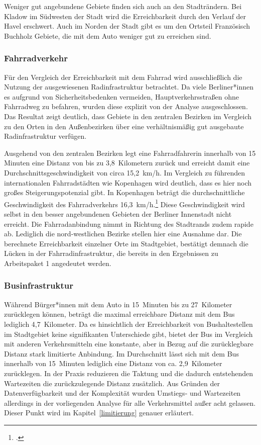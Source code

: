 Weniger gut angebundene Gebiete finden sich auch an den Stadträndern. Bei Kladow im Südwesten der Stadt wird die Erreichbarkeit durch den Verlauf der Havel erschwert. Auch im Norden der Stadt gibt es um den Ortsteil Französisch Buchholz Gebiete, die mit dem Auto weniger gut zu erreichen sind.

\subsubsection{Fahrradverkehr}

Für den Vergleich der Erreichbarkeit mit dem Fahrrad wird ausschließlich die Nutzung der ausgewiesenen Radinfrastruktur betrachtet. Da viele Berliner*innen es aufgrund von Sicherheitsbedenken vermeiden, Hauptverkehrsstraßen ohne Fahrradweg zu befahren, wurden diese explizit von der Analyse ausgeschlossen. Das Resultat zeigt deutlich, dass Gebiete in den zentralen Bezirken im Vergleich zu den Orten in den Außenbezirken über eine verhältnismäßig gut ausgebaute Radinfrastruktur verfügen.


Ausgehend von den zentralen Bezirken legt eine Fahrradfahrerin innerhalb von 15 Minuten eine Distanz von bis zu 3,8~Kilometern zurück und erreicht damit eine Durchschnittsgeschwindigkeit von circa 15,2~km/h. Im Vergleich zu führenden internationalen Fahrradstädten wie Kopenhagen wird deutlich, dass es hier noch großes Steigerungspotenzial gibt. In Kopenhagen beträgt die durchschnittliche Geschwindigkeit des Fahrradverkehrs 16,3~km/h.\footcite{kopenhagen}
Diese Geschwindigkeit wird selbst in den besser angebundenen Gebieten der Berliner Innenstadt nicht erreicht. Die Fahrradanbindung nimmt in Richtung des Stadtrands zudem rapide ab. Lediglich die nord-westlichen Bezirke stellen hier eine Ausnahme dar. Die berechnete Erreichbarkeit einzelner Orte im Stadtgebiet, bestätigt demnach die Lücken in der Fahrradinfrastruktur, die bereits in den Ergebnissen zu Arbeitspaket 1 angedeutet werden.

\subsubsection{Businfrastruktur}

Während Bürger*innen mit dem Auto in 15~Minuten bis zu 27~Kilometer zurücklegen können, beträgt die maximal erreichbare Distanz mit dem Bus lediglich 4,7~Kilometer. Da es hinsichtlich der Erreichbarkeit von Bushaltestellen im Stadtgebiet keine signifikanten Unterschiede gibt, bietet der Bus im Vergleich mit anderen Verkehrsmitteln eine konstante, aber in Bezug auf die zurücklegbare Distanz stark limitierte Anbindung. Im Durchschnitt lässt sich mit dem Bus innerhalb von 15~Minuten lediglich eine Distanz von ca. 2,9~Kilometer zurücklegen. In der Praxis reduzieren die Taktung und die dadurch entstehenden Wartezeiten die zurückzulegende Distanz zusätzlich. Aus Gründen der Datenverfügbarkeit und der Komplexität wurden  Umstiegs- und Wartezeiten allerdings in der vorliegenden Analyse für alle Verkehrsmittel außer acht gelassen. Dieser Punkt wird im Kapitel~\ref{limitierung} genauer erläutert.


